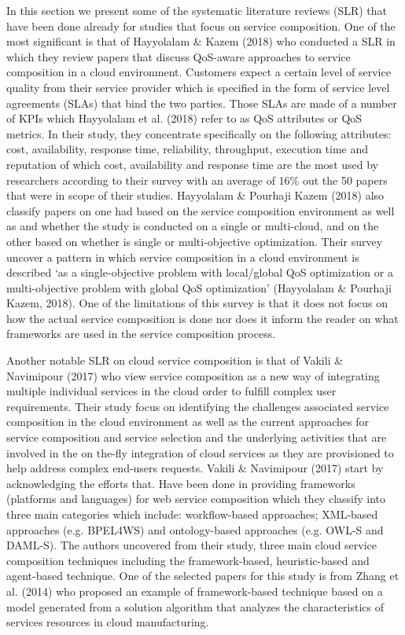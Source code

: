 \documentclass{article}
\begin{document}
\begin{multicols}{2}
In this section we present some of the systematic literature reviews (SLR) that have been done already for studies that focus on service composition. One of the most significant is that of Hayyolalam \& Kazem (2018)  who conducted a SLR in which they review papers that discuss QoS-aware approaches to service composition in a cloud environment. Customers expect a certain level of service quality from their service provider which is specified in the form of service level agreements (SLAs) that bind the two parties. Those SLAs are made of a number of KPIs which Hayyolalam et al. (2018) refer to as QoS attributes or QoS metrics. In their study, they concentrate specifically on the following attributes: cost, availability, response time, reliability, throughput, execution time and reputation of which cost, availability and response time are the most used by researchers according to their survey with an average of 16\% out the 50 papers that were in scope of their studies. Hayyolalam \& Pourhaji Kazem (2018) also classify papers on one had based on the service composition environment as well as and whether the study is conducted on a single or multi-cloud, and on the other based on whether is single or multi-objective optimization. Their survey uncover a pattern in which service composition in a cloud environment is described ‘as a single-objective problem with local/global QoS optimization or a multi-objective problem with global QoS optimization’ (Hayyolalam \& Pourhaji Kazem, 2018). One of the limitations of this survey is that it does not focus on how the actual service composition is done nor does it inform the reader on what frameworks are used in the service composition process. 

Another notable SLR on cloud service composition is that of Vakili \& Navimipour (2017) who view service composition as a new way of integrating multiple individual services in the cloud order to fulfill complex user requirements. Their study focus on identifying the challenges associated service composition in the cloud environment as well as the current approaches for service composition and service selection and the underlying activities that are involved in the on the-fly integration of cloud services as they are provisioned to help address complex end-users requests. Vakili \& Navimipour (2017) start by acknowledging the efforts that. Have been done in providing frameworks (platforms and languages) for web service composition which they classify into three main categories which include: workflow-based approaches; XML-based approaches (e.g. BPEL4WS) and ontology-based approaches (e.g. OWL-S and DAML-S). The authors uncovered from their study, three main cloud service composition techniques including the framework-based, heuristic-based and agent-based technique. One of the selected papers for this study is from Zhang et al. (2014) who proposed an example of framework-based technique based on a model generated from a solution algorithm that analyzes the characteristics of services resources in cloud manufacturing.


\end{multicols}
\end{document}
